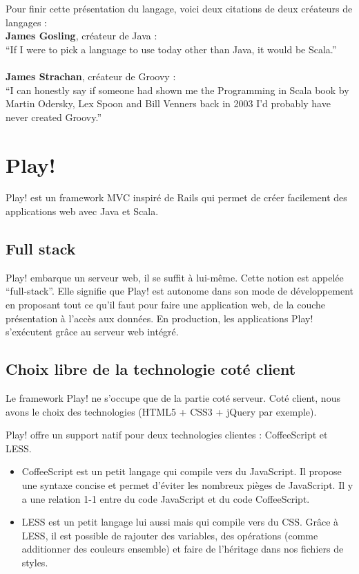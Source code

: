 Pour finir cette présentation du langage, voici deux citations de deux
créateurs de langages :\\
\textbf{James Gosling}, créateur de Java :\\
``If I were to pick a language to use today other than Java, it would be
Scala.''\\\\
\textbf{James Strachan}, créateur de Groovy :\\
``I can honestly say if someone had shown me the Programming in Scala
book by Martin Odersky, Lex Spoon and Bill Venners back in 2003 I’d probably
have never created Groovy.''\\




\section{Play!}

Play! est un framework MVC inspiré de Rails qui permet de créer facilement des
applications web avec Java et Scala.


\subsection{Full stack}
Play! embarque un serveur web, il se suffit à lui-même. Cette notion
est appelée “full-stack”. Elle signifie que Play! est autonome 
dans son mode de développement en proposant tout ce qu’il faut pour faire
une application web, de la couche présentation à l’accès aux données.
En production, les applications Play! s'exécutent grâce au serveur web intégré.

\subsection{Choix libre de la technologie coté client}

Le framework Play! ne s’occupe que de la partie coté serveur.
Coté client, nous avons le choix des technologies (HTML5 + CSS3 + jQuery
par exemple).

Play! offre un support natif pour deux technologies clientes :
CoffeeScript et LESS.
\begin{itemize}
\item CoffeeScript est un petit langage qui compile vers du JavaScript.
  Il propose une syntaxe concise et permet d'éviter les nombreux pièges de
  JavaScript. Il y a une relation 1-1 entre du code JavaScript et du code
  CoffeeScript.
\item LESS est un petit langage lui aussi mais qui compile vers du CSS.
  Grâce à LESS, il est possible de rajouter des variables, des opérations
  (comme additionner des couleurs ensemble) et faire de l'héritage dans nos
  fichiers de styles.
\end{itemize}

